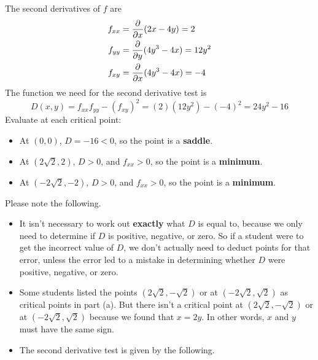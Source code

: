\begin{parts}
    \ifnum {} {\color{DarkBlue}
    The second derivatives of $f$ are
    \begin{align}
            f_{xx} &= \frac{\partial}{\partial x} (2x-4y) = 2 \\
            f_{yy} &= \frac{\partial}{\partial y} (4y^3-4x) = 12y^2 \\
            f_{xy} &= \frac{\partial}{\partial x} (4y^3-4x) = -4
    \end{align}
    The function we need for the second derivative test is 
    $$D(x,y) = f_{xx}f_{yy} - (f_{xy})^2 = (2)(12y^2) - (-4)^2 = 24y^2 - 16$$
    Evaluate at each critical point: 
    \begin{itemize}
        \item At $(0,0)$, $D=-16<0$, so the point is a \textbf{saddle}.
        \item At $(2\sqrt2,2)$, $D>0$, and $f_{xx}>0$, so the point is a \textbf{minimum}.
        \item At $(-2\sqrt2,-2)$, $D>0$, and $f_{xx}>0$, so the point is a \textbf{minimum}.
    \end{itemize}
    Please note the following. 
    \begin{itemize}
        \item It isn't necessary to work out \textbf{exactly} what $D$ is equal to, because we only need to determine if $D$ is positive, negative, or zero. So if a student were to get the incorrect value of $D$, we don't actually need to deduct points for that error, unless the error led to a mistake in determining whether $D$ were positive, negative, or zero. 
        \item Some students listed the points $(2\sqrt2,-\sqrt2)$ or at $(-2\sqrt2,\sqrt2)$ as critical points in part (a). But there isn't a critical point at $(2\sqrt2,-\sqrt2)$ or at $(-2\sqrt2,\sqrt2)$ because we found that $x=2y$. In other words, $x$ and $y$ must have the same sign. 
        \item The second derivative test is given by the following. 


\end{itemize}}
\end{parts}

